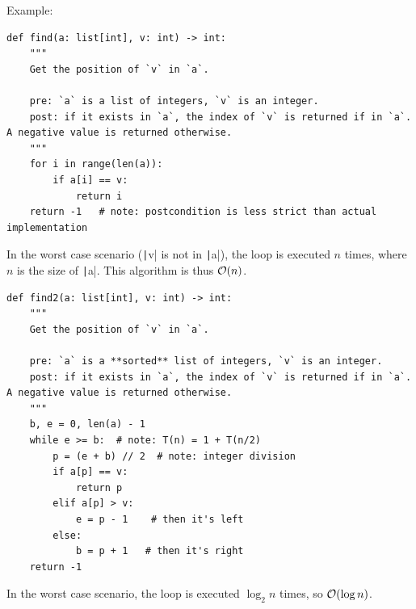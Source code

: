 \documentclass[10pt,
aspectratio=169
]{beamer}
\begin{document}
\begin{frame}[fragile]
	Example:\begin{verbatim}
def find(a: list[int], v: int) -> int:
	"""
	Get the position of `v` in `a`.
	
	pre: `a` is a list of integers, `v` is an integer.
	post: if it exists in `a`, the index of `v` is returned if in `a`. A negative value is returned otherwise.
	"""
	for i in range(len(a)): 
		if a[i] == v:
			return i 
	return -1   # note: postcondition is less strict than actual implementation
	\end{verbatim}
In the worst case scenario (\texttt|v| is not in \texttt|a|), the loop is executed $n$ times, where $n$ is the size of \texttt|a|. This algorithm is thus $\mathcal{O}(n)$.
\end{frame}

\begin{frame}[fragile]
\begin{verbatim}
def find2(a: list[int], v: int) -> int:
	"""
	Get the position of `v` in `a`.
	
	pre: `a` is a **sorted** list of integers, `v` is an integer.
	post: if it exists in `a`, the index of `v` is returned if in `a`. A negative value is returned otherwise.
	"""
	b, e = 0, len(a) - 1
	while e >= b:  # note: T(n) = 1 + T(n/2)
		p = (e + b) // 2  # note: integer division
		if a[p] == v:
			return p
		elif a[p] > v:
			e = p - 1    # then it's left
		else:
			b = p + 1   # then it's right
	return -1
\end{verbatim}
In the worst case scenario, the loop is executed $\log_2 n$ times, so $\mathcal{O}(\log n)$.
\end{frame}
\end{document}
